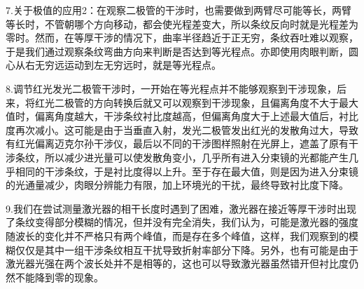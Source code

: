 \documentclass[10pt]{ctexart}
\begin{document}
7.关于极值的应用2：在观察二极管的干涉时，也需要做到两臂尽可能等长，两臂等长时，不管朝哪个方向移动，都会使光程差变大，所以条纹反向时就是光程差为零时。然而，在等厚干涉的情况下，曲率半径趋近于正无穷，条纹吞吐难以观察，于是我们通过观察条纹弯曲方向来判断是否达到等光程点。亦即使用肉眼判断，圆心从右无穷远运动到左无穷远时，就是等光程点。

8.调节红光发光二极管干涉时，一开始在等光程点并不能够观察到干涉现象，后来，将红光二极管的方向转换后就又可以观察到干涉现象，且偏离角度不大于最大值时，偏离角度越大，干涉条纹衬比度越高，但偏离角度大于上述最大值后，衬比度再次减小。这可能是由于当垂直入射，发光二极管发出红光的发散角过大，导致有红光偏离迈克尔孙干涉仪，最后以不同的干涉图样照射在光屏上，遮盖了原有干涉条纹，所以减少进光量可以使发散角变小，几乎所有进入分束镜的光都能产生几乎相同的干涉条纹，于是衬比度得以上升。至于存在最大值，则是因为进入分束镜的光通量减少，肉眼分辨能力有限，加上环境光的干扰，最终导致衬比度下降。

9.我们在尝试测量激光器的相干长度时遇到了困难，激光器在接近等厚干涉时出现了条纹变得部分模糊的情况，但并没有完全消失，我们认为，可能是激光器的强度随波长的变化并不严格只有两个峰值，而是存在多个峰值，这样，我们观察到的模糊仅仅是其中一组干涉条纹相互干扰导致折射率部分下降。另外，也有可能是由于激光器光强在两个波长处并不是相等的，这也可以导致激光器虽然错开但衬比度仍然不能降到零的现象。
\end{document}
